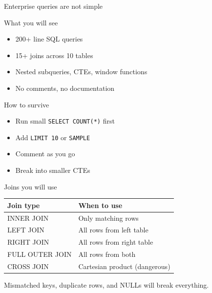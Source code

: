 \documentclass[aspectratio=169, 11pt]{beamer}
\begin{document}
	\begin{frame}{Enterprise queries are not simple}
		\tiny
		\begin{block}{What you will see}
			\begin{itemize}
				\item 200+ line SQL queries
				\item 15+ joins across 10 tables
				\item Nested subqueries, CTEs, window functions
				\item No comments, no documentation
			\end{itemize}
		\end{block}
		\begin{block}{How to survive}
			\tiny
			\begin{itemize}
				\item Run small \texttt{SELECT COUNT(*)} first
				\item Add \texttt{LIMIT 10} or \texttt{SAMPLE}
				\item Comment as you go
				\item Break into smaller CTEs
			\end{itemize}
		\end{block}
	\end{frame}
	
	\begin{frame}{Joins you will use}
		\tiny
		\begin{tabular}{p{3cm} p{5cm}}
			\toprule
			\textbf{Join type} & \textbf{When to use} \\
			\midrule
			INNER JOIN & Only matching rows \\
			LEFT JOIN & All rows from left table \\
			RIGHT JOIN & All rows from right table \\
			FULL OUTER JOIN & All rows from both \\
			CROSS JOIN & Cartesian product (dangerous) \\
			\bottomrule
		\end{tabular}
		\vspace{0.1cm}
		\tiny\alert{Mismatched keys, duplicate rows, and NULLs will break everything.}
	\end{frame}
	
\end{document}
